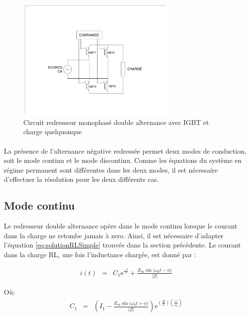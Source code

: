 \begin{figure}[htb!]
  \begin{center}  
    \includegraphics[width=0.7\textwidth]{Circuit/RedresseurMonophaseDoubleAlternanceIGBT}
    \caption{Circuit redresseur monophasé double alternance avec IGBT et charge quelquonque}
    \label{fig:RedresseurMonophaseDoubleAlternanceIGBT}
  \end{center}   
\end{figure}

\paragraph{}
La présence de l'alternance négative redressée permet deux modes de conduction, soit le mode continu et le mode discontinu. Comme les équations du système en régime permanent sont différentes dans les deux modes, il est nécessaire d'effectuer la résolution pour les deux différents cas.

\subsection{Mode continu}
Le redresseur double alternance opère dans le mode continu lorsque le courant dans la charge ne retombe jamais à zero. Ainsi, il est nécessaire d'adapter l'équation \ref{eq:solutionRLSimple} trouvée dans la section précédente. Le courant dans la charge RL, une fois l'inductance chargée, est donné par :

\begin{eqnarray}
\label{eq:RedresseurMonophaseDoubleAlternanceContinu11}
i(t) &=& C_1\mbox{e}^{\frac{-t}{\tau}} + \frac{E_m\sin{(\omega_0 t - \phi})}{|Z|}
\end{eqnarray}

Où:
\begin{eqnarray}
C_1 &=& \left( I_1 - \frac{E_m\sin{(\omega_0 t + \phi})}{|Z|}\right)\mbox{e}^{\left(\frac{R}{L}\right)\left(\frac{\pi}{\omega_0}\right)}
\end{eqnarray}

